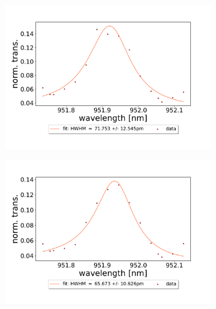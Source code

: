 \begin{figure}[h!]
\begin{subfigure}[b]{0.49\textwidth}
        \includegraphics[width=\textwidth]{figures/results/double fano fits/20250326/21um_M3:M5_fit_5.pdf}
        \caption{}
        \label{fig:21um_M3:M5_fit_5}
    \end{subfigure}
    \begin{subfigure}[b]{0.49\textwidth}
        \includegraphics[width=\textwidth]{figures/results/double fano fits/20250326/21um_M3:M5_fit_6.pdf}
        \caption{}
        \label{fig:21um_M3:M5_fit_6}
    \end{subfigure}
\end{figure}
